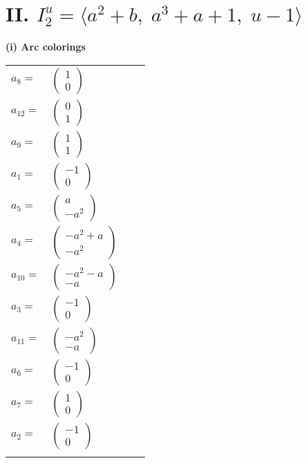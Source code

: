 \documentclass[1p]{elsarticle_modified}
\theoremstyle{definition}
\begin{document}
\centering \section*{II. $I^u_{2}= \langle a^2+b,\;a^3+a+1,\;u-1 \rangle$}
\flushleft \textbf{(i) Arc colorings}\\
\begin{tabular}{m{7pt} m{180pt} m{7pt} m{180pt} }
\flushright $a_{8}=$&$\begin{pmatrix}1\\0\end{pmatrix}$ \\
\flushright $a_{12}=$&$\begin{pmatrix}0\\1\end{pmatrix}$ \\
\flushright $a_{9}=$&$\begin{pmatrix}1\\1\end{pmatrix}$ \\
\flushright $a_{1}=$&$\begin{pmatrix}-1\\0\end{pmatrix}$ \\
\flushright $a_{5}=$&$\begin{pmatrix}a\\- a^2\end{pmatrix}$ \\
\flushright $a_{4}=$&$\begin{pmatrix}- a^2+a\\- a^2\end{pmatrix}$ \\
\flushright $a_{10}=$&$\begin{pmatrix}- a^2- a\\- a\end{pmatrix}$ \\
\flushright $a_{3}=$&$\begin{pmatrix}-1\\0\end{pmatrix}$ \\
\flushright $a_{11}=$&$\begin{pmatrix}- a^2\\- a\end{pmatrix}$ \\
\flushright $a_{6}=$&$\begin{pmatrix}-1\\0\end{pmatrix}$ \\
\flushright $a_{7}=$&$\begin{pmatrix}1\\0\end{pmatrix}$ \\
\flushright $a_{2}=$&$\begin{pmatrix}-1\\0\end{pmatrix}$\\&\end{tabular}
\end{document}
